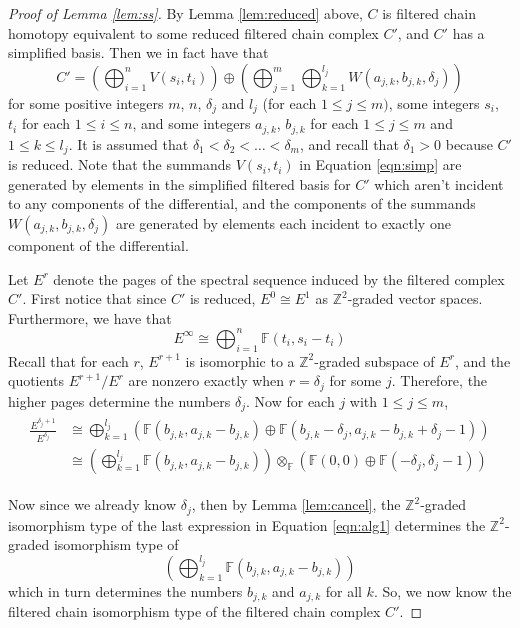 \documentclass[11pt]{article}
\theoremstyle{plain} \newtheorem{thm}{Theorem}[subsection]
\theoremstyle{plain} \newtheorem{cor}[thm]{Corollary}
\theoremstyle{plain} \newtheorem{prop}[thm]{Proposition}
\theoremstyle{plain} \newtheorem{conj}[thm]{Conjecture}
\theoremstyle{plain} \newtheorem{lem}[thm]{Lemma}
\theoremstyle{definition} \newtheorem{df}[thm]{Definition}
\theoremstyle{remark} \newtheorem{rmk}[thm]{Remark}
\theoremstyle{remark} \newtheorem{obs}[thm]{Observation}
\numberwithin{equation}{section}
\begin{document}
\begin{proof}[Proof of Lemma \ref{lem:ss}]
By Lemma \ref{lem:reduced} above, $C$ is filtered chain homotopy equivalent to some reduced filtered chain complex $C'$, and $C'$ has a simplified basis.  Then we in fact have that
 \begin{equation}\label{eqn:simp}
 C' = \left( \bigoplus_{i = 1}^{n} V(s_i, t_i) \right) \oplus \left( \bigoplus_{j=1}^{m} \bigoplus_{k = 1}^{l_j} W(a_{j,k}, b_{j,k}, \delta_j) \right)
 \end{equation}
 for some positive integers $m$, $n$, $\delta_j$ and $l_j$ (for each $1 \leq j \leq m)$, some integers $s_i$, $t_i$ for each $1 \leq i \leq n$, and some integers $a_{j,k}$, $b_{j,k}$ for each $1 \leq j \leq m$ and $1 \leq k \leq l_j$.  It is assumed that $\delta_1 < \delta_2 < \ldots < \delta_m$, and recall that $\delta_1 > 0$ because $C'$ is reduced.  Note that the summands $V(s_i, t_i)$ in Equation \ref{eqn:simp} are generated by elements in the simplified filtered basis for $C'$ which aren't incident to any components of the differential, and the components of the summands $W(a_{j,k}, b_{j,k}, \delta_j)$ are generated by elements each incident to exactly one component of the differential.
 
Let $E^r$ denote the pages of the spectral sequence induced by the filtered complex $C'$.  First notice that since $C'$ is reduced, $E^0 \cong E^1$ as $\mathbb{Z}^2$-graded vector spaces.  Furthermore, we have that
$$ E^{\infty} \cong \bigoplus_{i = 1}^n \mathbb{F}(t_i, s_i - t_i)$$
Recall that for each $r$, $E^{r+1}$ is isomorphic to a $\mathbb{Z}^2$-graded subspace of $E^r$, and the quotients $E^{r+1}/E^r$ are nonzero exactly when $r = \delta_j$ for some $j$.  Therefore, the higher pages determine the numbers $\delta_j$.  Now for each $j$ with $1 \leq j \leq m$,
\begin{gather}
\begin{aligned}\label{eqn:alg1}
\frac{E^{\delta_j + 1}}{E^{\delta_j}} &\cong
\bigoplus_{k = 1}^{l_j} \left( \mathbb{F}(b_{j,k},a_{j,k} - b_{j,k}) \oplus \mathbb{F}(b_{j,k} - \delta_j, a_{j,k} -b_{j,k} + \delta_j-1) \right)\\
&\cong \left( \bigoplus_{k=1}^{l_j} \mathbb{F}(b_{j,k}, a_{j,k} - b_{j,k}) \right)
\otimes_{\mathbb{F}} \left( \mathbb{F}(0,0) \oplus \mathbb{F}(-\delta_j, \delta_j - 1) \right)
\end{aligned}
\end{gather}

Now since we already know $\delta_j$, then by Lemma \ref{lem:cancel}, the $\mathbb{Z}^2$-graded isomorphism type of the last expression in Equation \ref{eqn:alg1} determines the $\mathbb{Z}^2$-graded isomorphism type of
$$\left( \bigoplus_{k=1}^{l_j} \mathbb{F}(b_{j,k}, a_{j,k} - b_{j,k}) \right)$$
which in turn determines the numbers $b_{j,k}$ and $a_{j,k}$ for all $k$.  So, we now know the filtered chain isomorphism type of the filtered chain complex $C'$.
\end{proof}
\end{document}
